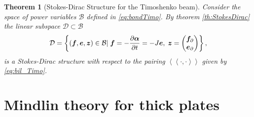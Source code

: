 \documentclass[preprint,12pt]{elsarticle}
\newtheorem{theorem}{Theorem}
\begin{document}
{\begin{theorem}[Stokes-Dirac Structure for the Timoshenko beam]
	Consider the space of power variables $\mathcal{B}$ defined in \eqref{eq:bondTimo}. By theorem \ref{th:StokesDirac} the linear subspace $\mathcal{D} \subset \mathcal{B}$
	\begin{equation}
	\mathcal{D} =  \left\{(\bm{f}, \bm{e},\bm{z}) \in \mathcal{B} | \; \bm{f} = - \diffp{\bm{\alpha}}{t} = -J\bm{e}, \; \bm{z} = \begin{pmatrix} \bm{f}_{\partial} \\ \bm{e}_{\partial} \end{pmatrix} 
 \right\},
	\end{equation}
	is a Stokes-Dirac structure with respect to the pairing $\left\langle \left\langle \cdot, \cdot \right\rangle \right\rangle$ given by \eqref{eq:bil_Timo}.
\end{theorem}
}

\section{Mindlin theory for thick plates}
\label{sec:Min_Var}
\end{document}
